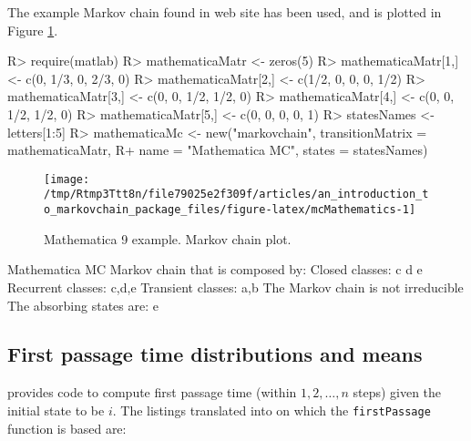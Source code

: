 \documentclass[
  nojss]{jss}
\begin{document}
The example Markov chain found in  web site \citep{mathematica9MarkovChain} has
been used, and is plotted in Figure \ref{fig:mcMathematics}.

\begin{CodeChunk}

\begin{CodeInput}
R> require(matlab)
R> mathematicaMatr <- zeros(5)
R> mathematicaMatr[1,] <- c(0, 1/3, 0, 2/3, 0)
R> mathematicaMatr[2,] <- c(1/2, 0, 0, 0, 1/2)
R> mathematicaMatr[3,] <- c(0, 0, 1/2, 1/2, 0)
R> mathematicaMatr[4,] <- c(0, 0, 1/2, 1/2, 0)
R> mathematicaMatr[5,] <- c(0, 0, 0, 0, 1)
R> statesNames <- letters[1:5]
R> mathematicaMc <- new("markovchain", transitionMatrix = mathematicaMatr,
R+                    name = "Mathematica MC", states = statesNames)
\end{CodeInput}
\end{CodeChunk}

\begin{CodeChunk}
\begin{figure}

{\centering \texttt{[image: /tmp/Rtmp3Ttt8n/file79025e2f309f/articles/an\_introduction\_to\_markovchain\_package\_files/figure-latex/mcMathematics-1]} 

}

\caption[Mathematica 9 example]{Mathematica 9 example. Markov chain plot.}\label{fig:mcMathematics}
\end{figure}
\end{CodeChunk}

\begin{CodeChunk}

\begin{CodeOutput}
Mathematica MC  Markov chain that is composed by: 
Closed classes: 
c d 
e 
Recurrent classes: 
{c,d},{e}
Transient classes: 
{a,b}
The Markov chain is not irreducible 
The absorbing states are: e
\end{CodeOutput}
\end{CodeChunk}

\hypertarget{first-passage-time-distributions-and-means}{%
\subsection{First passage time distributions and means}\label{first-passage-time-distributions-and-means}}

\cite{renaldoMatlab} provides code to compute first passage time (within \(1,2,\ldots, n\) steps) given the initial state to be \(i\). The  listings translated into  on which the \texttt{firstPassage} function is based are:
\end{document}
